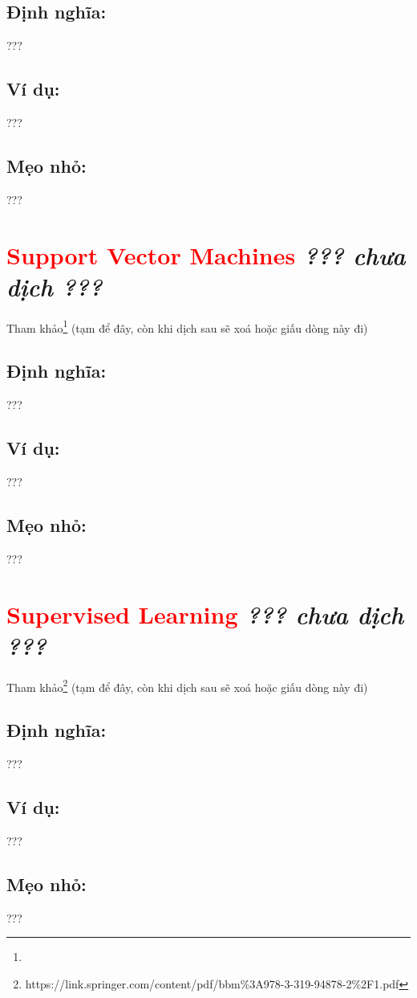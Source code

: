 \subsection*{Định nghĩa:}
???
\subsection*{Ví dụ:}
???
\subsection*{Mẹo nhỏ:}
???
\section*{\huge \textcolor{Red}{Support Vector Machines}  \small \textit{??? chưa dịch ???} }
Tham khảo\footnote{} (tạm để đây, còn khi dịch sau sẽ xoá hoặc giấu dòng này đi)
\subsection*{Định nghĩa:}
???
\subsection*{Ví dụ:}
???
\subsection*{Mẹo nhỏ:}
???
\section*{\huge \textcolor{Red}{Supervised Learning}  \small \textit{??? chưa dịch ???} }
Tham khảo\footnote{https://link.springer.com/content/pdf/bbm\%3A978-3-319-94878-2\%2F1.pdf} (tạm để đây, còn khi dịch sau sẽ xoá hoặc giấu dòng này đi)
\subsection*{Định nghĩa:}
???
\subsection*{Ví dụ:}
???
\subsection*{Mẹo nhỏ:}
???
